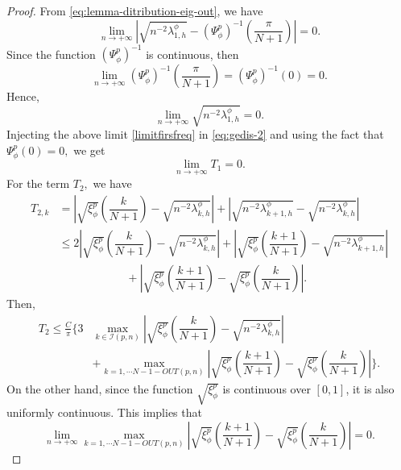 \documentclass[11pt]{article}
\begin{document}
\begin{proof}
From \eqref{eq:lemma-ditribution-eig-out}, we have 
$$\lim_{n \rightarrow +\infty}\left|    \sqrt{n^{-2}\lambda_{1,h}^{\phi}}   -  \left(\Psi^{p}_{\phi}\right)^{-1}\left(\frac{\pi}{N+1}\right)\right|= 0.$$
Since the function $ \left(\Psi^{p}_{\phi}\right)^{-1}$ is continuous, then  $$\lim_{n \rightarrow +\infty} \left(\Psi^{p}_{\phi}\right)^{-1}\left(\frac{\pi}{N+1}\right)=\left(\Psi^{p}_{\phi}\right)^{-1}\left(0\right)=0. $$
Hence,
\begin{equation}\label{limitfirsfreq}
    \lim_{n \rightarrow +\infty} \sqrt{n^{-2}\lambda_{1,h}^{\phi}} =0.
\end{equation}
Injecting  the above limit \eqref{limitfirsfreq} in \eqref{eq:gedis-2} and using the fact that $\Psi^p_{\phi}(0)=0,
$
we get 
\begin{equation}\label{limitT1}
   \lim_{n \rightarrow +\infty}T_1=0 .
\end{equation}
For the term $T_2,$ 
we have 
\begin{align*}
    T_{2,k}&=\left|\sqrt{\xi_{\phi}^p}\left(\dfrac{k}{N+1}\right)- \sqrt{n^{-2}\lambda_{k,h}^{\phi}}   \right|+ \left|  \sqrt{ n^{-2}\lambda_{k+1,h}^{\phi}}-\sqrt{n^{-2}\lambda_{k,h}^{\phi}}\right|\\
    &\leq 2 \left|\sqrt{\xi_{\phi}^p}\left(\dfrac{k}{N+1}\right)- \sqrt{n^{-2}\lambda_{k,h}^{\phi}}   \right| + \left|\sqrt{\xi_{\phi}^p}\left(\dfrac{k+1}{N+1}\right)- \sqrt{n^{-2}\lambda_{k+1,h}^{\phi}}   \right|\\
    &\quad\quad\quad\quad\quad\quad+\left| \sqrt{\xi_{\phi}^p}\left(\dfrac{k+1}{N+1}\right)-\sqrt{\xi_{\phi}^p}\left(\dfrac{k}{N+1}\right) \right|.
\end{align*}
Then,
\begin{align}\label{divlt2}
    T_2\leq \frac{C}{\pi}\Bigg\{3 &\max_{k \in \mathcal{I}(p,n)}\left|\sqrt{\xi_{\phi}^p}\left(\dfrac{k}{N+1}\right)- \sqrt{n^{-2}\lambda_{k,h}^{\phi}}   \right| \nonumber \\
    &+ \max_{k=1,\cdots N-1-OUT(p,n)} \left| \sqrt{\xi_{\phi}^p}\left(\dfrac{k+1}{N+1}\right)-\sqrt{\xi_{\phi}^p}\left(\dfrac{k}{N+1}\right) \right|\Bigg\}.
\end{align}
On the other hand, since the function $\sqrt{\xi_{\phi}^p}$ is continuous over  $[0,1]$, it is also uniformly continuous. This implies that
\begin{equation}\label{uniformconverxi}
    \lim_{n \rightarrow +\infty} \max_{k=1,\cdots N-1-OUT(p,n)} \left| \sqrt{\xi_{\phi}^p}\left(\dfrac{k+1}{N+1}\right)-\sqrt{\xi_{\phi}^p}\left(\dfrac{k}{N+1}\right) \right|=0.

\end{equation}
\end{proof}
\end{document}
